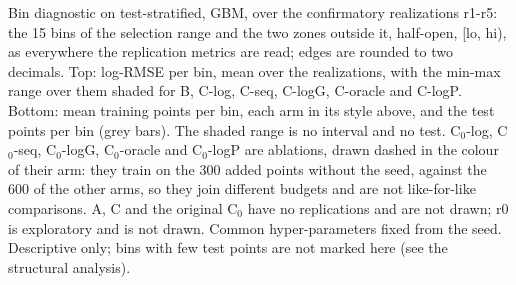 Bin diagnostic on test-stratified, GBM, over the confirmatory realizations r1-r5: the 15 bins of the selection range and the two zones outside it, half-open, [lo, hi), as everywhere the replication metrics are read; edges are rounded to two decimals. Top: log-RMSE per bin, mean over the realizations, with the min-max range over them shaded for B, C-log, C-seq, C-logG, C-oracle and C-logP. Bottom: mean training points per bin, each arm in its style above, and the test points per bin (grey bars). The shaded range is no interval and no test. C$_0$-log, C$_0$-seq, C$_0$-logG, C$_0$-oracle and C$_0$-logP are ablations, drawn dashed in the colour of their arm: they train on the 300 added points without the seed, against the 600 of the other arms, so they join different budgets and are not like-for-like comparisons. A, C and the original C$_0$ have no replications and are not drawn; r0 is exploratory and is not drawn. Common hyper-parameters fixed from the seed. Descriptive only; bins with few test points are not marked here (see the structural analysis).
